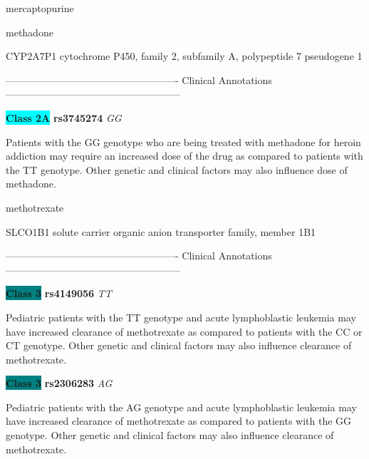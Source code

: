 \documentclass{resume} %
\begin{document}
\begin{rSection}{ mercaptopurine }
\end{rSection}\begin{rSection}{ methadone }
\item[]

\begin{rSubsection}{ CYP2A7P1 }{ cytochrome P450, family 2, subfamily A, polypeptide 7 pseudogene 1 }{}{}
\item[]

\item[] ---------------------------------------------------- Clinical Annotations -----------------------------------------------------\newline
\item \textbf{\colorbox{cyan} {Class 2A}} \textbf{ rs3745274 } \textit{ GG }
\item[] Patients with the GG genotype who are being treated with methadone for heroin addiction may require an increased dose of the drug as compared to patients with the TT genotype. Other genetic and clinical factors may also influence dose of methadone.
\end{rSubsection}

\end{rSection}\begin{rSection}{ methotrexate }
\item[]

\begin{rSubsection}{ SLCO1B1 }{ solute carrier organic anion transporter family, member 1B1 }{}{}
\item[]

\item[] ---------------------------------------------------- Clinical Annotations -----------------------------------------------------\newline
\item \textbf{\colorbox{teal} {Class 3}} \textbf{ rs4149056 } \textit{ TT }
\item[] Pediatric patients with the TT genotype and acute lymphoblastic leukemia may have increased clearance of methotrexate as compared to patients with the CC or CT genotype. Other genetic and clinical factors may also influence clearance of methotrexate.\item \textbf{\colorbox{teal} {Class 3}} \textbf{ rs2306283 } \textit{ AG }
\item[] Pediatric patients with the AG genotype and acute lymphoblastic leukemia may have increased clearance of methotrexate as compared to patients with the GG genotype. Other genetic and clinical factors may also influence clearance of methotrexate. 
\end{rSubsection}


\end{rSection}
\end{document}
